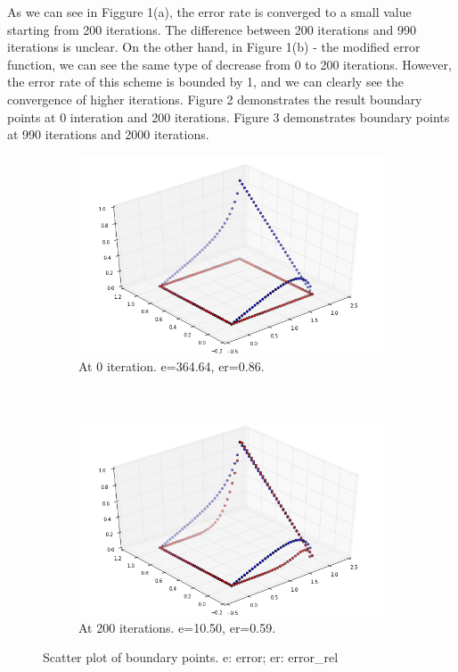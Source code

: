 \documentclass[a4paper,12pt]{article}
\begin{document}
As we can see in Figgure 1(a), the error rate is converged to a small value starting from 200 iterations. The difference between 200 iterations and 990 iterations is unclear. On the other hand, in Figure 1(b) - the modified error function, we can see the same type of decrease from 0 to 200 iterations. However, the error rate of this scheme is bounded by 1, and we can clearly see the convergence of higher iterations. Figure 2 demonstrates the result boundary points at 0 interation and 200 iterations. Figure 3 demonstrates boundary points at 990 iterations and 2000 iterations.

\pagebreak

\begin{figure}[h!]
  \centering
  \begin{subfigure}[b]{0.48\textwidth}
    \includegraphics[width=\textwidth]{hpsc_a1_scat_0.png}
    \caption{At 0 iteration. e=364.64, er=0.86.}
  \end{subfigure}
~
\begin{subfigure}[b]{0.48\textwidth}
    \includegraphics[width=\textwidth]{hpsc_a1_scat_20.png}
    \caption{At 200 iterations. e=10.50, er=0.59.}
  \end{subfigure}
  \caption{Scatter plot of boundary points. e: error; er: error\_rel}
\end{figure}
\end{document}
